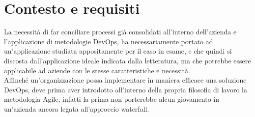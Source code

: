\documentclass[a4paper, 12pt]{report}
\numberwithin{equation}{section}
\begin{document}
\chapter{Contesto e requisiti}\label{requisiti}
La necessità di far conciliare processi già consolidati all’interno dell’azienda e l’applicazione di metodologie DevOps, ha necessariamente portato ad un’applicazione studiata appositamente per il caso in esame, e che quindi si discosta dall’applicazione ideale indicata dalla letteratura, ma che potrebbe essere applicabile ad aziende con le stesse caratteristiche e necessità.\\
Affinché un’organizzazione possa implementare in maniera efficace una soluzione DevOps, deve prima aver introdotto all’interno della propria filosofia di lavoro la metodologia Agile, infatti la prima non porterebbe alcun giovamento in un’azienda ancora legata all’approccio waterfall.
\end{document}
